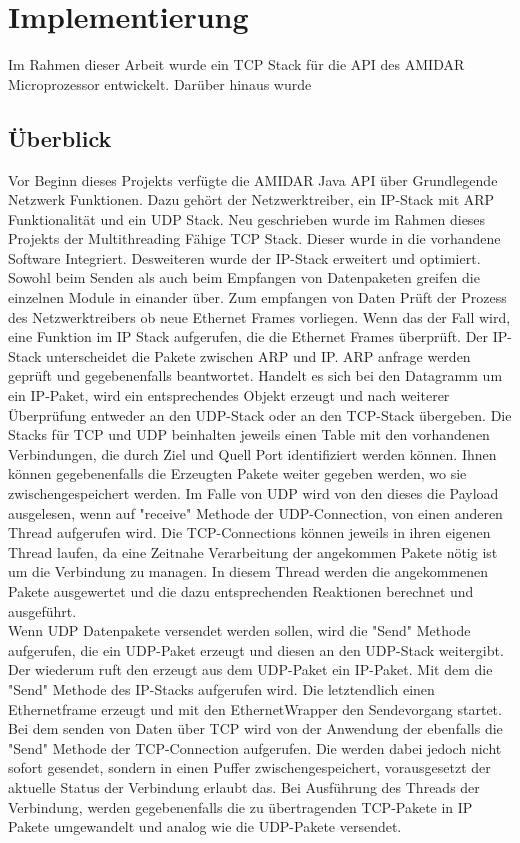 \chapter{Implementierung}
Im Rahmen dieser Arbeit wurde ein TCP Stack für die API des AMIDAR Microprozessor entwickelt. Darüber hinaus wurde 

\section{Überblick}
Vor Beginn dieses Projekts verfügte die AMIDAR Java API über Grundlegende Netzwerk Funktionen. Dazu gehört der Netzwerktreiber, ein IP-Stack mit ARP Funktionalität und ein UDP Stack. Neu geschrieben wurde im Rahmen dieses Projekts der Multithreading Fähige TCP Stack. Dieser wurde in die vorhandene Software Integriert. Desweiteren wurde der IP-Stack erweitert und optimiert. \\
Sowohl beim Senden als auch beim Empfangen von Datenpaketen greifen die einzelnen Module in einander über. Zum empfangen von Daten Prüft der Prozess des Netzwerktreibers ob neue Ethernet Frames vorliegen. Wenn das der Fall wird, eine Funktion im IP Stack aufgerufen, die die Ethernet Frames überprüft. Der IP-Stack unterscheidet die Pakete zwischen ARP und IP. ARP anfrage werden geprüft und gegebenenfalls beantwortet. Handelt es sich bei den Datagramm um ein IP-Paket, wird ein entsprechendes Objekt erzeugt und nach weiterer Überprüfung entweder an den UDP-Stack oder an den TCP-Stack übergeben. Die Stacks für TCP und UDP beinhalten jeweils einen Table mit den vorhandenen Verbindungen, die durch Ziel und Quell Port identifiziert werden können. Ihnen können gegebenenfalls die Erzeugten Pakete weiter gegeben werden, wo sie zwischengespeichert werden. Im Falle von UDP wird von den dieses die Payload ausgelesen, wenn auf "receive"{} Methode der UDP-Connection, von einen anderen Thread aufgerufen wird. Die TCP-Connections können jeweils in ihren eigenen Thread laufen, da eine Zeitnahe Verarbeitung der angekommen Pakete nötig ist um die Verbindung zu managen. In diesem Thread werden die angekommenen Pakete ausgewertet und die dazu entsprechenden Reaktionen berechnet und ausgeführt. \\
Wenn UDP Datenpakete versendet werden sollen, wird die {}"Send"{} Methode aufgerufen, die ein UDP-Paket erzeugt und diesen an den UDP-Stack weitergibt. Der wiederum ruft den erzeugt aus dem UDP-Paket ein IP-Paket. Mit dem die {}"Send"{} Methode des IP-Stacks aufgerufen wird. Die letztendlich einen Ethernetframe erzeugt und mit den EthernetWrapper den Sendevorgang startet.\\ 
Bei dem senden von Daten über TCP wird von der Anwendung der ebenfalls die {}"Send"{} Methode der TCP-Connection aufgerufen. Die werden dabei jedoch nicht sofort gesendet, sondern in einen Puffer zwischengespeichert, vorausgesetzt der aktuelle Status der Verbindung erlaubt das. Bei Ausführung des Threads der Verbindung, werden gegebenenfalls die zu übertragenden TCP-Pakete in IP Pakete umgewandelt und analog wie die UDP-Pakete versendet. 



